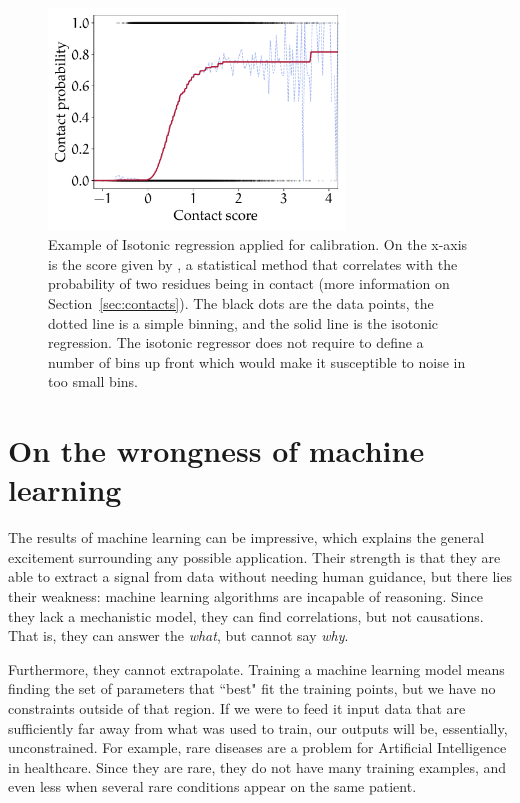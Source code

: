 \begin{figure}[hbt]
	\centering
	\includegraphics[width=0.7\textwidth]{machine_learning/figures/isotonic}
	\caption{Example of Isotonic regression applied for calibration.
	On the x-axis is the score given by \GaussDCA, a statistical method that correlates with the probability of two residues being in contact (more information on Section~\ref{sec:contacts}).
	The black dots are the data points, the dotted line is a simple binning, and the solid line is the isotonic regression.
	The isotonic regressor does not require to define a number of bins up front which would make it susceptible to noise in too small bins.}\label{fig:isotonic}
\end{figure}



\section{On the wrongness of machine learning}\label{sec:wrong}
The results of machine learning can be impressive, which explains the general excitement surrounding any possible application.
Their strength is that they are able to extract a signal from data without needing human guidance, but there lies their weakness: machine learning algorithms are incapable of reasoning.
Since they lack a mechanistic model, they can find correlations, but not causations.
That is, they can answer the \emph{what}, but cannot say \emph{why}.

Furthermore, they cannot extrapolate.
Training a machine learning model means finding the set of parameters that ``best" fit the training points,  but we have no constraints outside of that region.
If we were to feed it input data that are sufficiently far away from what was used to train, our outputs will be, essentially, unconstrained.
For example, rare diseases are a problem for Artificial Intelligence in healthcare.
Since they are rare, they do not have many training examples, and even less when several rare conditions appear on the same patient.

